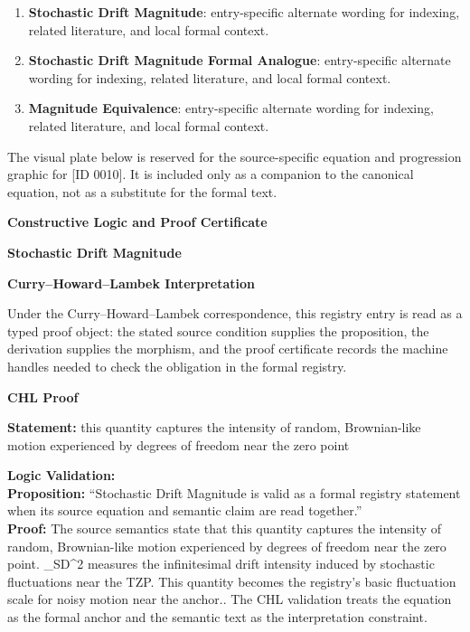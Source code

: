 \begingroup\footnotesize\sloppy
\begin{enumerate}[leftmargin=1.35em,itemsep=1pt,topsep=1pt,parsep=0pt]
\item \textbf{Stochastic Drift Magnitude}: entry-specific alternate wording for indexing, related literature, and local formal context.
\item \textbf{Stochastic Drift Magnitude Formal Analogue}: entry-specific alternate wording for indexing, related literature, and local formal context.
\item \textbf{Magnitude Equivalence}: entry-specific alternate wording for indexing, related literature, and local formal context.
\end{enumerate}
\endgroup

\begingroup\footnotesize\sloppy
The visual plate below is reserved for the source-specific equation and progression graphic for [ID 0010]. It is included only as a companion to the canonical equation, not as a substitute for the formal text.
\par\endgroup
\ifTZPDarkEdition
{}
\fi

\clearpage
\begingroup\tzpsupportsetup
\noindent\textbf{\fontsize{10.8pt}{12.8pt}\selectfont [ID 0010] Constructive Logic and Proof Certificate}\par
\noindent\textbf{\fontsize{10pt}{12pt}\selectfont Stochastic Drift Magnitude}\par
\vspace{0.45em}
\begingroup
\footnotesize
\setlength{\parskip}{0.22em}
\setlength{\parindent}{0pt}
\noindent\textbf{Curry--Howard--Lambek Interpretation}\par
Under the Curry--Howard--Lambek correspondence, this registry entry is read as a typed proof
object: the stated source condition supplies the proposition, the derivation supplies the
morphism, and the proof certificate records the machine handles needed to check the obligation
in the formal registry.

\vspace{0.45em}
\noindent\textbf{CHL Proof}\par
\textbf{Statement:} this quantity captures the intensity of random, Brownian-like motion experienced by
degrees of freedom near the zero point

\textbf{Logic Validation:}\\
\textbf{Proposition:} ``Stochastic Drift Magnitude is valid as a formal registry statement when its source
equation and semantic claim are read together.''\\
\textbf{Proof:} The source semantics state that this quantity captures the intensity of random,
Brownian-like motion experienced by degrees of freedom near the zero point. \_SD\textasciicircum{}2
measures the infinitesimal drift intensity induced by stochastic fluctuations near the
TZP. This quantity becomes the registry's basic fluctuation scale for noisy motion near
the anchor.. The CHL validation treats the equation as the formal anchor and the
semantic text as the interpretation constraint.

